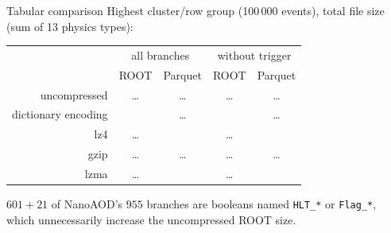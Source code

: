 \documentclass[aspectratio=169]{beamer}
\begin{document}
\begin{frame}{Tabular comparison}
\vspace{0.5 cm}
Highest cluster/row group (100\,000 events), total file size (sum of 13 physics types):

\begin{center}
\begin{tabular}{r c c | c c}
                    & \multicolumn{2}{c}{all branches} & \multicolumn{2}{c}{without trigger} \\
                    & ROOT & Parquet & ROOT & Parquet \\\hline
uncompressed        & \ldots & \ldots & \ldots & \ldots \\
dictionary encoding & & \ldots & & \ldots \\
lz4                 & \ldots & & \ldots & \\
gzip                & \ldots & \ldots & \ldots & \ldots \\
lzma                & \ldots & & \ldots & \\
\end{tabular}
\end{center}

$601+21$ of NanoAOD's $955$ branches are booleans named {\tt\small HLT\_*} or {\tt\small Flag\_*}, which unnecessarily increase the uncompressed ROOT size.
\end{frame}
\end{document}
